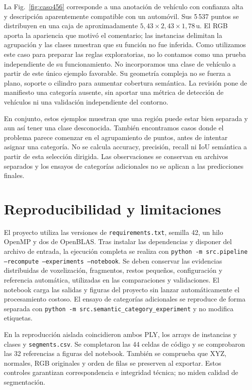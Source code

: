 \documentclass[journal,onecolumn]{IEEEtran}
\newcommand{\ucoord}{\,\mathrm{u}}
\begin{document}
La Fig.~\ref{fig:caso456} corresponde a una anotación de vehículo con confianza alta y descripción aparentemente compatible con un automóvil. Sus 5\,537 puntos se distribuyen en una caja de aproximadamente $5,43\times2,43\times1,78\ucoord$. El RGB aporta la apariencia que motivó el comentario; las instancias delimitan la agrupación y las clases muestran que su función no fue inferida. Como utilizamos este caso para preparar las reglas exploratorias, no lo contamos como una prueba independiente de su funcionamiento. No incorporamos una clase de vehículo a partir de este único ejemplo favorable. Su geometría compleja no se fuerza a plano, soporte o cilindro para aumentar cobertura semántica. La revisión pone de manifiesto una categoría ausente, sin aportar una métrica de detección de vehículos ni una validación independiente del contorno.

En conjunto, estos ejemplos muestran que una región puede estar bien separada y aun así tener una clase desconocida. También encontramos casos donde el problema parece comenzar en el agrupamiento de puntos, antes de intentar asignar una categoría. No se calcula accuracy, precisión, recall ni IoU semántica a partir de esta selección dirigida. Las observaciones se conservan en archivos separados y los ensayos de categorías adicionales no se aplican a las predicciones finales.

\section{Reproducibilidad y limitaciones}
El proyecto utiliza las versiones de \texttt{requirements.txt}, semilla 42, un hilo OpenMP y dos de OpenBLAS. Tras instalar las dependencias y disponer del archivo de entrada, la ejecución completa se realiza con \texttt{python -m src.pipeline --recompute --experiments --notebook}. Se deben conservar las evidencias distribuidas de voxelización, fragmentos, restos pequeños, configuración y referencia automática, utilizadas en las comparaciones y validaciones. El notebook carga las salidas y figuras del proyecto sin lanzar automáticamente el procesamiento costoso. El ensayo de categorías adicionales se reproduce de forma separada con \texttt{python -m src.semantic\_category\_experiment} y no modifica etiquetas.

En la reproducción aislada coincidieron ambos PLY, los arrays de instancias y clases y \texttt{segments.csv}. Se completaron las 44 celdas de código y se comprobaron las 32 referencias a figuras del notebook. También se comprueba que XYZ, normales, RGB originales y orden de filas se preserven al exportar. Estos controles garantizan correspondencia e integridad técnica; no miden calidad de segmentación.
\end{document}
